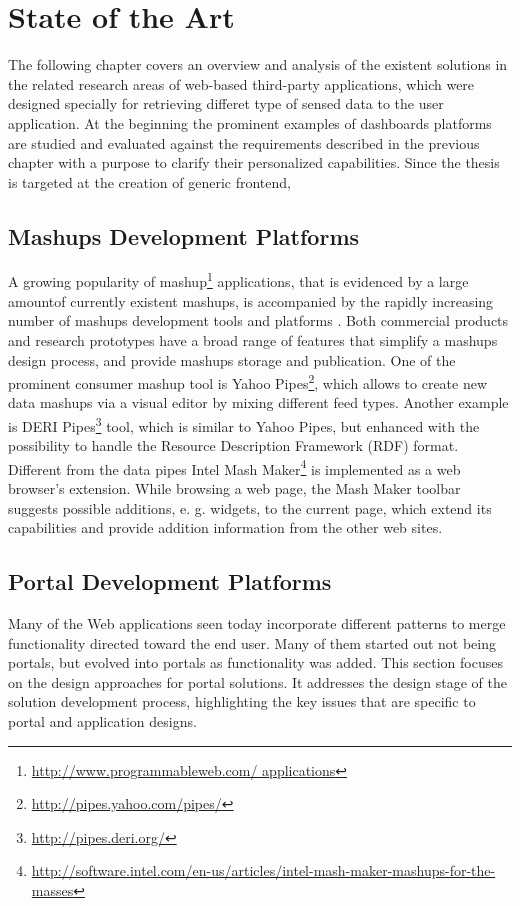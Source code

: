 \chapter{State of the Art}
The following chapter covers an overview and analysis of the existent solutions in
the related research areas of web-based third-party applications, which were designed specially for retrieving differet type of sensed data to the user application. At the beginning the prominent examples of dashboards platforms are studied and evaluated against the requirements described in the previous chapter with a purpose to clarify their personalized capabilities.
 Since the thesis is targeted at the creation of generic frontend, 

\section{Mashups Development Platforms}
A growing popularity of mashup\footnote{\url{http://www.programmableweb.com/ applications}} applications, that is evidenced by a large amountof currently existent mashups, is accompanied by the rapidly increasing number of
mashups development tools and platforms \cite{taivalsaari2009mashware, koschmider2009elucidating, daniel2010toward, aghaee2012reusable}. Both commercial products and research prototypes have a broad range of features that
simplify a mashups design process, and provide mashups storage and publication.
One of the prominent consumer mashup tool is Yahoo Pipes\footnote{\url{http://pipes.yahoo.com/pipes/}}, which allows to create new data mashups via a visual editor by mixing different feed types. Another example is DERI Pipes\footnote{\url{http://pipes.deri.org/}} tool, which is similar to Yahoo Pipes, but enhanced with the possibility to handle the Resource Description
Framework (RDF) format. Different from the data pipes Intel Mash Maker\footnote{\url{http://software.intel.com/en-us/articles/intel-mash-maker-mashups-for-the-masses}} is implemented as a web browser’s extension. While browsing a web page, the Mash
Maker toolbar suggests possible additions, e. g. widgets, to the current page, which
extend its capabilities and provide addition information from the other web sites.

\section{Portal Development Platforms}
Many of the Web applications seen today incorporate different patterns to merge
functionality directed toward the end user. Many of them started out not being
portals, but evolved into portals as functionality was added.
This section focuses on the design approaches for portal solutions. 
It addresses the design stage of the solution development process, highlighting the key issues that are specific to portal and
application designs\cite{nath2006challenge,pautasso2008restful,seong2006usability}.

